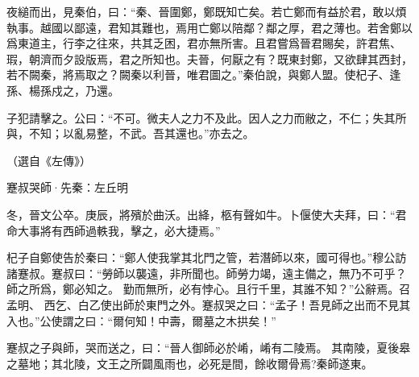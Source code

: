 \documentclass[12pt,a4paper]{ctexbook}
\begin{document}
夜縋而出，見秦伯，曰：“秦、晉圍鄭，鄭既知亡矣。若亡鄭而有益於君，敢以煩執事。越國以鄙遠，君知其難也，焉用亡鄭以陪鄰？鄰之厚，君之薄也。若舍鄭以爲東道主，行李之往來，共其乏困，君亦無所害。且君嘗爲晉君賜矣，許君焦、瑕，朝濟而夕設版焉，君之所知也。夫晉，何厭之有？既東封鄭，又欲肆其西封，若不闕秦，將焉取之？闕秦以利晉，唯君圖之。”秦伯說，與鄭人盟。使杞子、逢孫、楊孫戍之，乃還。\par
子犯請擊之。公曰：“不可。微夫人之力不及此。因人之力而敝之，不仁；失其所與，不知；以亂易整，不武。吾其還也。”亦去之。\par
（選自《左傳》）\par
蹇叔哭師·先秦：左丘明 \par
冬，晉文公卒。庚辰，將殯於曲沃。出絳，柩有聲如牛。卜偃使大夫拜，曰：“君命大事將有西師過軼我，擊之，必大捷焉。”\par
杞子自鄭使告於秦曰：“鄭人使我掌其北門之管，若潛師以來，國可得也。”穆公訪諸蹇叔。蹇叔曰：“勞師以襲遠，非所聞也。師勞力竭，遠主備之，無乃不可乎？師之所爲，鄭必知之。 勤而無所，必有悖心。且行千里，其誰不知？”公辭焉。召孟明、 西乞、白乙使出師於東門之外。蹇叔哭之曰：“孟子！吾見師之出而不見其入也。”公使謂之曰：“爾何知！中壽，爾墓之木拱矣！”\par
蹇叔之子與師，哭而送之，曰：“晉人御師必於崤，崤有二陵焉。 其南陵，夏後皋之墓地；其北陵，文王之所闢風雨也，必死是間，餘收爾骨焉?秦師遂東。\par
\end{document}
